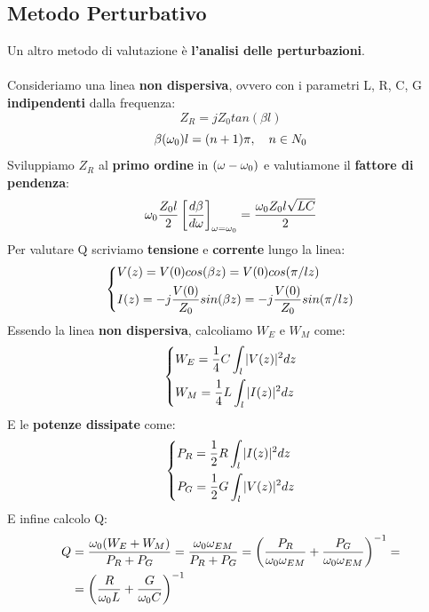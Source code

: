\subsection{Metodo Perturbativo}
Un altro metodo di valutazione è \textbf{l'analisi delle perturbazioni}.\\ \\
Consideriamo una linea \textbf{non dispersiva}, ovvero con i parametri L, R, C, G \textbf{indipendenti} dalla frequenza:
\begin{equation*}
    Z_R = j Z_0 tan(\beta l)
\end{equation*}
\begin{equation*}
    \beta(\omega_0) l = (n + 1) \pi, \quad n \in N_0
\end{equation*}
Sviluppiamo $Z_R$ al\textbf{ primo ordine} in $(\omega -\omega_0) $ e valutiamone il\textbf{ fattore di pendenza}:
\begin{equation*}
    \omega_0 \frac{Z_0 l}{2}  \left[\frac{d\beta}{d \omega}\right]_{\omega=\omega_0} = \frac{\omega_0 Z_0 l \sqrt{LC}}{2}
\end{equation*}
Per valutare Q scriviamo \textbf{tensione} e \textbf{corrente} lungo la linea:
\begin{equation*}
    \begin{dcases}
    V(z) = V(0) cos(\beta z) = V(0) cos(\pi/l z)\\
    I(z) = - j \frac{V(0)}{Z_0} sin(\beta z) = - j \frac{V(0)}{Z_0} sin(\pi/l z)
    \end{dcases}
\end{equation*}
Essendo la linea \textbf{non dispersiva}, calcoliamo $W_E$ e $W_M$ come:
\begin{equation*}
    \begin{dcases}
    W_E = \frac{1}{4} C \int_l |V(z)|^2 dz\\
    W_M = \frac{1}{4} L \int_l |I(z)|^2 dz
    \end{dcases}
\end{equation*}
E le \textbf{potenze dissipate} come:
\begin{equation*}
    \begin{dcases}
    P_R = \frac{1}{2} R \int_l |I(z)|^2 dz\\
    P_G = \frac{1}{2} G \int_l |V(z)|^2 dz
    \end{dcases}
\end{equation*}
E infine calcolo Q:
\begin{equation*}
\begin{aligned}
    Q &= \frac{\omega_0 (W_E + W_M)}{P_R + P_G} = \frac{\omega_0 \omega_{EM}}{P_R + P_G} = \left(\frac{P_R}{\omega_0 \omega_{EM}} + \frac{P_G}{\omega_0 \omega_{EM}} \right)^{-1} = \\
    &=\left(\frac{R}{\omega_0 L} + \frac{G}{\omega_0 C}\right)^{-1} 
\end{aligned}
\end{equation*}



